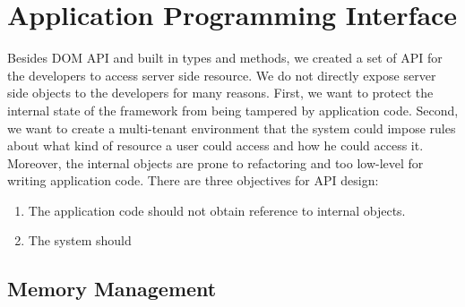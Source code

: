 \chapter{Application Programming Interface}
\label{ch:api}
Besides DOM API and built in types and methods,
we created a set of API for the developers to access server side resource.
We do not directly expose server side objects to the developers for many reasons.
First, we want to protect the internal state of the framework from 
being tampered by application code.
Second, 
we want to create a multi-tenant environment that 
the system could impose rules about what kind of resource a user could access and how
he could access it.
Moreover, 
the internal objects are prone to refactoring and 
too low-level for writing application code.
There are three objectives for API design:
\begin{enumerate}
\item The application code should not obtain reference to internal objects.
\item The system should 
\end{enumerate}



\section{Memory Management}